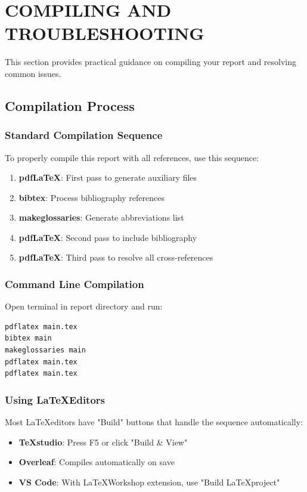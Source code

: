\section*{COMPILING AND TROUBLESHOOTING}

This section provides practical guidance on compiling your report and resolving common issues.

\subsection*{Compilation Process}

\subsubsection*{Standard Compilation Sequence}

To properly compile this report with all references, use this sequence:

\begin{enumerate}
    \item \textbf{pdf\LaTeX}: First pass to generate auxiliary files
    \item \textbf{bibtex}: Process bibliography references
    \item \textbf{makeglossaries}: Generate abbreviations list
    \item \textbf{pdf\LaTeX}: Second pass to include bibliography
    \item \textbf{pdf\LaTeX}: Third pass to resolve all cross-references
\end{enumerate}

\subsubsection*{Command Line Compilation}

Open terminal in report directory and run:

\begin{verbatim}
pdflatex main.tex
bibtex main
makeglossaries main
pdflatex main.tex
pdflatex main.tex
\end{verbatim}

\subsubsection*{Using \LaTeX Editors}

Most \LaTeX editors have "Build" buttons that handle the sequence automatically:

\begin{itemize}
    \item \textbf{TeXstudio}: Press F5 or click "Build \& View"
    \item \textbf{Overleaf}: Compiles automatically on save
    \item \textbf{VS Code}: With \LaTeX Workshop extension, use "Build \LaTeX project"
\end{itemize}

